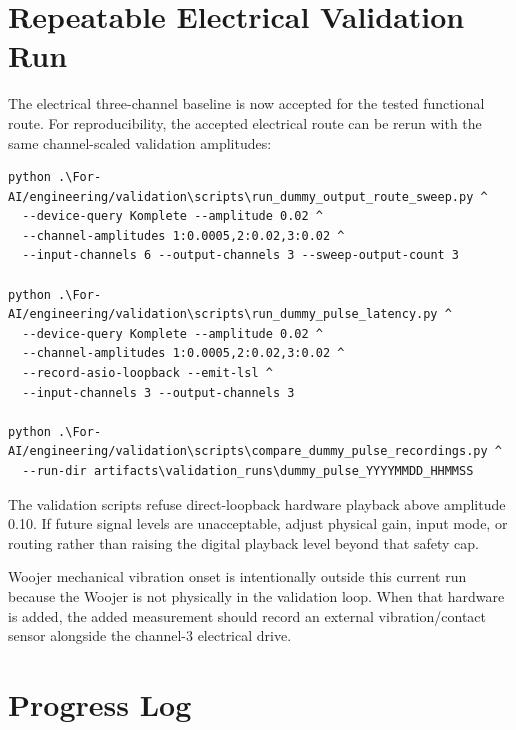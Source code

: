 \documentclass[11pt]{article}
\begin{document}
\section{Repeatable Electrical Validation Run}

The electrical three-channel baseline is now accepted for the tested functional
route. For reproducibility, the accepted electrical route can be rerun with the same
channel-scaled validation amplitudes:

\begin{verbatim}
python .\For-AI/engineering/validation\scripts\run_dummy_output_route_sweep.py ^
  --device-query Komplete --amplitude 0.02 ^
  --channel-amplitudes 1:0.0005,2:0.02,3:0.02 ^
  --input-channels 6 --output-channels 3 --sweep-output-count 3

python .\For-AI/engineering/validation\scripts\run_dummy_pulse_latency.py ^
  --device-query Komplete --amplitude 0.02 ^
  --channel-amplitudes 1:0.0005,2:0.02,3:0.02 ^
  --record-asio-loopback --emit-lsl ^
  --input-channels 3 --output-channels 3

python .\For-AI/engineering/validation\scripts\compare_dummy_pulse_recordings.py ^
  --run-dir artifacts\validation_runs\dummy_pulse_YYYYMMDD_HHMMSS
\end{verbatim}

The validation scripts refuse direct-loopback hardware playback above amplitude
0.10. If future signal levels are unacceptable, adjust physical gain, input
mode, or routing rather than raising the digital playback level beyond that
safety cap.

Woojer mechanical vibration onset is intentionally outside this current run
because the Woojer is not physically in the validation loop. When that hardware
is added, the added measurement should record an external vibration/contact
sensor alongside the channel-3 electrical drive.

\section{Progress Log}
\end{document}
